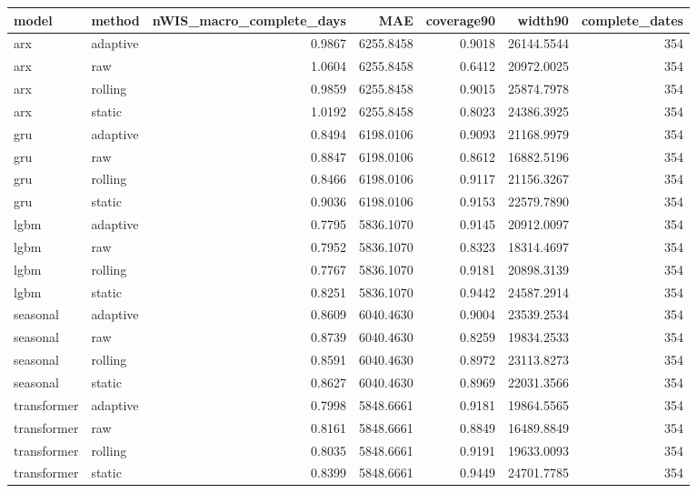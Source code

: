 \begin{tabular}{llrrrrr}
\toprule
model & method & nWIS\_macro\_complete\_days & MAE & coverage90 & width90 & complete\_dates \\
\midrule
arx & adaptive & 0.9867 & 6255.8458 & 0.9018 & 26144.5544 & 354 \\
arx & raw & 1.0604 & 6255.8458 & 0.6412 & 20972.0025 & 354 \\
arx & rolling & 0.9859 & 6255.8458 & 0.9015 & 25874.7978 & 354 \\
arx & static & 1.0192 & 6255.8458 & 0.8023 & 24386.3925 & 354 \\
gru & adaptive & 0.8494 & 6198.0106 & 0.9093 & 21168.9979 & 354 \\
gru & raw & 0.8847 & 6198.0106 & 0.8612 & 16882.5196 & 354 \\
gru & rolling & 0.8466 & 6198.0106 & 0.9117 & 21156.3267 & 354 \\
gru & static & 0.9036 & 6198.0106 & 0.9153 & 22579.7890 & 354 \\
lgbm & adaptive & 0.7795 & 5836.1070 & 0.9145 & 20912.0097 & 354 \\
lgbm & raw & 0.7952 & 5836.1070 & 0.8323 & 18314.4697 & 354 \\
lgbm & rolling & 0.7767 & 5836.1070 & 0.9181 & 20898.3139 & 354 \\
lgbm & static & 0.8251 & 5836.1070 & 0.9442 & 24587.2914 & 354 \\
seasonal & adaptive & 0.8609 & 6040.4630 & 0.9004 & 23539.2534 & 354 \\
seasonal & raw & 0.8739 & 6040.4630 & 0.8259 & 19834.2533 & 354 \\
seasonal & rolling & 0.8591 & 6040.4630 & 0.8972 & 23113.8273 & 354 \\
seasonal & static & 0.8627 & 6040.4630 & 0.8969 & 22031.3566 & 354 \\
transformer & adaptive & 0.7998 & 5848.6661 & 0.9181 & 19864.5565 & 354 \\
transformer & raw & 0.8161 & 5848.6661 & 0.8849 & 16489.8849 & 354 \\
transformer & rolling & 0.8035 & 5848.6661 & 0.9191 & 19633.0093 & 354 \\
transformer & static & 0.8399 & 5848.6661 & 0.9449 & 24701.7785 & 354 \\
\bottomrule
\end{tabular}
